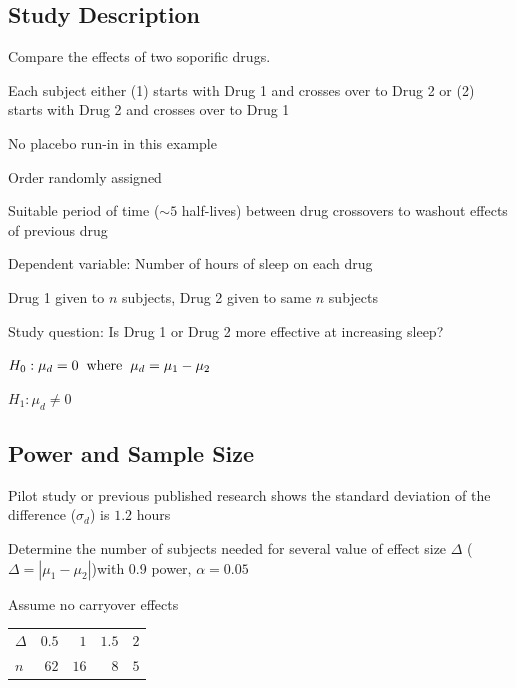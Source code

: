 \subsection{Study Description}

\bi
\item Compare the effects of two soporific drugs.
\item Each subject either (1) starts with Drug 1 and crosses over to Drug 2 or (2) starts with Drug 2 and crosses over to Drug 1
  \bi
    \item No placebo run-in in this example
    \item Order randomly assigned
    \item Suitable period of time ($\sim 5$ half-lives) between drug
      crossovers to washout effects of previous drug 
  \ei
\item Dependent variable: Number of hours of sleep on each drug
\item Drug 1 given to $n$ subjects, Drug 2 given to same $n$ subjects
\item Study question: Is Drug 1 or Drug 2 more effective at increasing sleep?
  \bi
  \item $H_0: \mu_d = 0 \hspace{.2cm} \textrm{where} \hspace{.2cm} \mu_d = \mu_1 - \mu_2$
  \item $H_1: \mu_d \neq 0$
  \ei
\ei


\subsection{Power and Sample Size}

\bi
\item Pilot study or previous published research shows the standard deviation of the difference ($\sigma_d$) is $1.2$ hours
\item Determine the number of subjects needed for several value of effect size $\Delta$ ($\Delta = |\mu_1 - \mu_2|$)with 0.9 power, $\alpha = 0.05$
\item Assume no carryover effects
\ei

 \begin{center}
 \begin{tabular}{lrrrr}\hline\hline
$\Delta$ &$ 0.5$&$ 1$&$1.5$&$2$\\
$n$ &$62$&$16$&$8$&$5$\\
\hline
\end{tabular}
\end{center}

